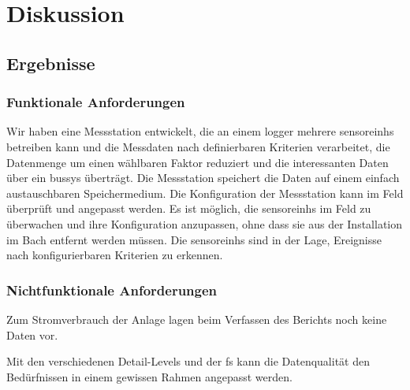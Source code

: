 %
%

\chapter{Diskussion}\label{chap.diskussion}

\section{Ergebnisse}
\subsection{Funktionale Anforderungen}
Wir haben eine Messstation entwickelt, die an einem \gls{logger} mehrere \glspl{sensoreinh} betreiben kann und die Messdaten nach definierbaren Kriterien verarbeitet, die Datenmenge um einen wählbaren Faktor reduziert und die interessanten Daten über ein \gls{bussys} überträgt. Die Messstation speichert die Daten auf einem einfach austauschbaren Speichermedium. Die Konfiguration der Messstation kann im Feld überprüft und angepasst werden. Es ist möglich, die \glspl{sensoreinh} im Feld zu überwachen und ihre Konfiguration anzupassen, ohne dass sie aus der Installation im Bach entfernt werden müssen. Die \glspl{sensoreinh} sind in der Lage, Ereignisse nach konfigurierbaren Kriterien zu erkennen.


\subsection{Nichtfunktionale Anforderungen}
Zum Stromverbrauch der Anlage lagen beim Verfassen des Berichts noch keine Daten vor.

Mit den verschiedenen Detail-Levels und der \gls{fs} kann die Datenqualität den Bedürfnissen in einem gewissen Rahmen angepasst werden.

